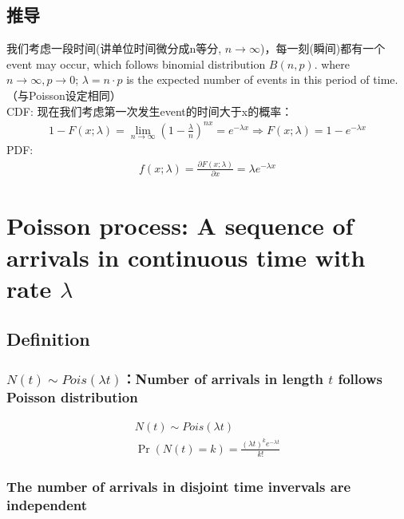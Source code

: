 \documentclass[11pt,a4paper]{article}
\begin{document}
\subsection{推导}
我们考虑一段时间(讲单位时间微分成n等分, $n \rightarrow \infty$)，每一刻(瞬间)都有一个event may occur, which follows binomial distribution $B(n,p)$. where $n \rightarrow \infty, p \rightarrow 0$; $\lambda=n\cdot p$ is the expected number of events in this period of time. （与Poisson设定相同）\\
CDF: 现在我们考虑第一次发生event的时间大于x的概率：
\begin{equation}
    \begin{aligned}
        1-F(x;\lambda)=\lim_{n \rightarrow \infty}(1-\frac{\lambda}{n})^{nx}=e^{-\lambda x}
        \Rightarrow F(x;\lambda)=1-e^{-\lambda x}
    \end{aligned}
    \nonumber
\end{equation}
PDF:
\begin{equation}
    \begin{aligned}
        f(x;\lambda)=\frac{\partial F(x;\lambda)}{\partial x}=\lambda e^{-\lambda x}
    \end{aligned}
    \nonumber
\end{equation}

\section{Poisson process: A sequence of arrivals in continuous time with rate $\lambda$}
\subsection{Definition}
\subsubsection{$N(t)\sim Pois(\lambda t)$：Number of arrivals in length $t$ follows Poisson distribution}
\begin{equation}
    \begin{aligned}
        N(t)\sim Pois(\lambda t)\\
        \Pr(N(t)=k)=\frac{(\lambda t)^k e^{-\lambda t}}{k!}
    \end{aligned}
    \nonumber
\end{equation}
\subsubsection{The number of arrivals in disjoint time invervals are independent}
\end{document}
